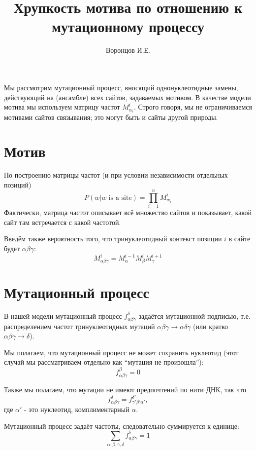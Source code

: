 \documentclass[a4paper]{article}
\begin{document}
\title{Хрупкость мотива по отношению к мутационному процессу}
\author{Воронцов И.Е.}
\maketitle
Мы рассмотрим мутационный процесс, вносящий однонуклеотидные замены, действующий на (ансамбле) всех сайтов, задаваемых мотивом. В качестве модели мотива мы используем матрицу частот $M^i_{\alpha_i}$. Строго говоря, мы не ограничиваемся мотивами сайтов связывания; это могут быть и сайты другой природы.
\section{Мотив}
По построению матрицы частот (и при условии независимости отдельных позиций) $$P(w | w \text{ is a site}) = \prod_{i=1}^n M^i_{w_i}$$
Фактически, матрица частот описывает всё множество сайтов и показывает, какой сайт там встречается с какой частотой.

Введём также вероятность того, что тринуклеотидный контекст позиции $i$ в сайте будет $\alpha\beta\gamma$:
\begin{equation*}
M^i_{\alpha\beta\gamma} = M^{i-1}_{\alpha}M^i_{\beta}M^{i+1}_{\gamma}
\end{equation*}


\section{Мутационный процесс}
В нашей модели мутационный процесс $f_{\alpha\beta\gamma}^{\delta}$ задаётся мутационной подписью, т.е. распределением частот тринуклеотидных мутаций $\alpha\beta\gamma\to\alpha\delta\gamma$ (или кратко $\alpha\beta\gamma\to\delta$).

Мы полагаем, что мутационный процесс не может сохранить нуклеотид (этот случай мы рассматриваем отдельно как ``мутация не произошла''):
$$f_{\alpha\beta\gamma}^{\beta} = 0$$

Также мы полагаем, что мутации не имеют предпочтений по нити ДНК, так что
$$f_{\alpha\beta\gamma}^{\delta} = f_{\gamma'\beta'\alpha'}^{\delta'},$$
где $\alpha'$ - это нуклеотид, комплиментарный $\alpha$.

Мутационный процесс задаёт частоты, следовательно суммируется к единице:
\begin{equation*}
\sum_{\alpha,\beta,\gamma,\delta} f_{\alpha\beta\gamma}^{\delta} = 1
\end{equation*}
\end{document}

